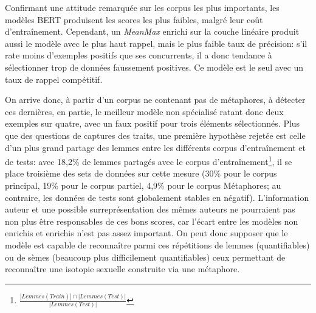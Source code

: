 Confirmant une attitude remarquée sur les corpus les plus importants, les modèles BERT produisent les scores les plus faibles, malgré leur coût d'entraînement. Cependant, un \textit{MeanMax} enrichi sur la couche linéaire produit aussi le modèle avec le plus haut rappel, mais le plus faible taux de précision: s'il rate moins d'exemples positifs que ses concurrents, il a donc tendance à sélectionner trop de données faussement positives. Ce modèle est le seul avec un taux de rappel compétitif.

On arrive donc, à partir d'un corpus ne contenant pas de métaphores, à détecter ces dernières, en partie, le meilleur modèle non spécialisé ratant donc deux exemples sur quatre, avec un faux positif pour trois éléments sélectionnés. Plus que des questions de captures des traits, une première hypothèse rejetée est celle d'un plus grand partage des lemmes entre les différents corpus d'entraînement et de tests: avec 18,2\% de lemmes partagés avec le corpus d'entraînement\footnote{$\frac{|Lemmes(Train)| \cap |Lemmes(Test)|}{|Lemmes(Test)|}$}, il se place troisième des sets de données sur cette mesure (30\% pour le corpus principal, 19\% pour le corpus partiel, 4,9\% pour le corpus Métaphores; au contraire, les données de tests sont globalement stables en négatif). L'information auteur et une possible surreprésentation des mêmes auteurs ne pourraient pas non plus être responsables de ces bons scores, car l'écart entre les modèles non enrichis et enrichis n'est pas assez important. On peut donc supposer que le modèle est capable de reconnaître parmi ces répétitions de lemmes (quantifiables) ou de sèmes (beaucoup plus difficilement quantifiables) ceux permettant de reconnaître une isotopie sexuelle construite via une métaphore.

